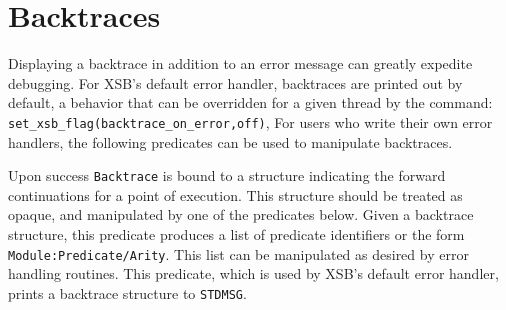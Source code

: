 \section{Backtraces}

Displaying a backtrace in addition to an error message can greatly
expedite debugging.  For XSB's default error handler, backtraces are
printed out by default, a behavior that can be overridden for a given
thread by the command: {\tt set\_xsb\_flag(backtrace\_on\_error,off)},
For users who write their own error handlers, the following predicates
can be used to manipulate backtraces.

\begin{description}
Upon success {\tt Backtrace} is bound to a structure indicating the
forward continuations for a point of execution.  This structure should
be treated as opaque, and manipulated by one of the predicates below.
%
Given a backtrace structure, this predicate produces a list of
predicate identifiers or the form {\tt Module:Predicate/Arity}.  This
list can be manipulated as desired by error handling routines.
%
 This predicate, which is used by XSB's default error handler, prints
 a backtrace structure to {\tt STDMSG}.
\end{description}
